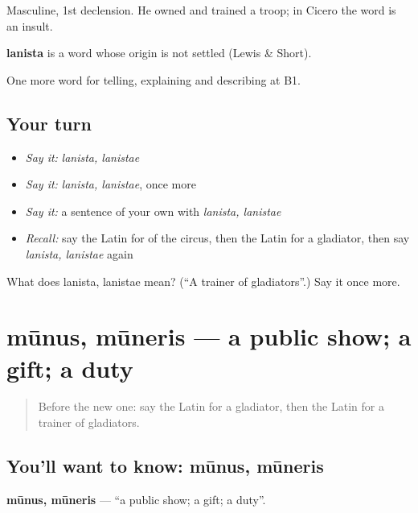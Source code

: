 Masculine, 1st declension. He owned and trained a troop; in Cicero the word is an insult.

\begin{cousinweb}
\textbf{lanista} is a word whose origin is not settled (Lewis \& Short).
\end{cousinweb}

\begin{grammarlens}[title={What you've built}]
One more word for telling, explaining and describing at B1.
\end{grammarlens}

\subsection*{Your turn}
\begin{itemize}
\raggedright
  \item \emph{Say it:} \emph{lanista, lanistae}
  \item \emph{Say it:} \emph{lanista, lanistae}, once more
  \item \emph{Say it:} a sentence of your own with \emph{lanista, lanistae}
  \item \emph{Recall:} say the Latin for of the circus, then the Latin for a gladiator, then say \emph{lanista, lanistae} again
\end{itemize}

\begin{tcolorbox}[breakable,colback=teal!4,colframe=teal!35!black,title={Before you move on}]
What does lanista, lanistae mean? (\textquotedblleft{}A trainer of gladiators\textquotedblright{}.) Say it once more.
\end{tcolorbox}
\section[mūnus, mūneris]{mūnus, mūneris — a public show; a gift; a duty}

\label{lesson:LA-C336-munus}



\begin{quote}
Before the new one: say the Latin for a gladiator, then the Latin for a trainer of gladiators.
\end{quote}

\subsection*{You'll want to know: mūnus, mūneris}
\textbf{mūnus, mūneris} — \textquotedblleft{}a public show; a gift; a duty\textquotedblright{}.

